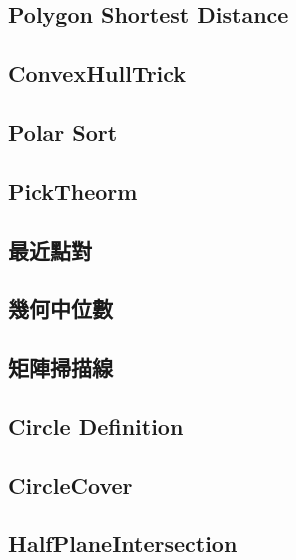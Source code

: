 \subsection{Polygon Shortest Distance}


\subsection{ConvexHullTrick}


\subsection{Polar Sort}


\subsection{PickTheorm}


\subsection{最近點對}


\subsection{幾何中位數}


\subsection{矩陣掃描線}


\subsection{Circle Definition}


\subsection{CircleCover}


\subsection{HalfPlaneIntersection}


